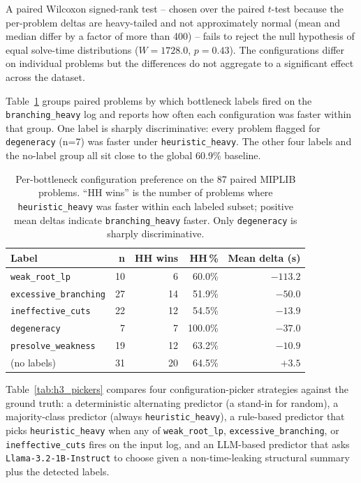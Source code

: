\documentclass[11pt]{article}
\begin{document}
A paired Wilcoxon signed-rank test \cite{wilcoxon1945} -- chosen over the paired $t$-test because the per-problem deltas are heavy-tailed and not approximately normal (mean and median differ by a factor of more than 400) -- fails to reject the null hypothesis of equal solve-time distributions ($W = 1728.0$, $p = 0.43$). The configurations differ on individual problems but the differences do not aggregate to a significant effect across the dataset.

Table~\ref{tab:h3_per_label} groups paired problems by which bottleneck labels fired on the \texttt{branching\_heavy} log and reports how often each configuration was faster within that group. One label is sharply discriminative: every problem flagged for \texttt{degeneracy} (n=7) was faster under \texttt{heuristic\_heavy}. The other four labels and the no-label group all sit close to the global 60.9\% baseline.

\begin{table}[h]
\centering
\begin{tabular}{lrrrr}
\toprule
\textbf{Label} & \textbf{n} & \textbf{HH wins} & \textbf{HH\,\%} & \textbf{Mean delta (s)} \\
\midrule
\texttt{weak\_root\_lp}        & 10 &  6 & 60.0\% & $-113.2$ \\
\texttt{excessive\_branching}  & 27 & 14 & 51.9\% & $-50.0$ \\
\texttt{ineffective\_cuts}     & 22 & 12 & 54.5\% & $-13.9$ \\
\texttt{degeneracy}            &  7 &  7 & 100.0\% & $-37.0$ \\
\texttt{presolve\_weakness}    & 19 & 12 & 63.2\% & $-10.9$ \\
(no labels)                    & 31 & 20 & 64.5\% & $+3.5$ \\
\bottomrule
\end{tabular}
\caption{Per-bottleneck configuration preference on the 87 paired MIPLIB problems. ``HH wins'' is the number of problems where \texttt{heuristic\_heavy} was faster within each labeled subset; positive mean deltas indicate \texttt{branching\_heavy} faster. Only \texttt{degeneracy} is sharply discriminative.}
\label{tab:h3_per_label}
\end{table}

Table~\ref{tab:h3_pickers} compares four configuration-picker strategies against the ground truth: a deterministic alternating predictor (a stand-in for random), a majority-class predictor (always \texttt{heuristic\_heavy}), a rule-based predictor that picks \texttt{heuristic\_heavy} when any of \texttt{weak\_root\_lp}, \texttt{excessive\_branching}, or \texttt{ineffective\_cuts} fires on the input log, and an LLM-based predictor that asks \texttt{Llama-3.2-1B-Instruct} to choose given a non-time-leaking structural summary plus the detected labels.
\end{document}
